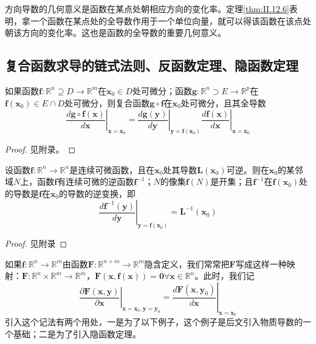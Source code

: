 \documentclass[main.tex]{subfiles}
\begin{document}
方向导数的几何意义是函数在某点处朝相应方向的变化率。定理\ref{thm:II.12.6}表明，拿一个函数在某点处的全导数作用于一个单位向量，就可以得该函数在该点处朝该方向的变化率。这也是函数的全导数的重要几何意义。
\subsection{复合函数求导的链式法则、反函数定理、隐函数定理}
\begin{theorem}[复合函数求导的链式法则]\label{thm:II.12.7}
如果函数$\mathbf{f}:\mathbb{R}^n\supseteq D\rightarrow\mathbb{R}^m$在$\mathbf{x}_0\in D$处可微分；函数$\mathbf{g}:\mathbb{R}^n\supset E\rightarrow\mathbb{R}^p$在$\mathbf{f}\left(\mathbf{x}_0\right)\in E\cap D$处可微分，则复合函数$\mathbf{g}\circ\mathbf{f}$在$\mathbf{x}_0$处可微分，且其全导数
\[
\left.\frac{d\mathbf{g}\circ\mathbf{f}\left(\mathbf{x}\right)}{d\mathbf{x}}\right|_{\mathbf{x}=\mathbf{x}_0}=\left.\frac{d\mathbf{g}\left(\mathbf{y}\right)}{d\mathbf{y}}\right|_{\mathbf{y}=\mathbf{f}\left(\mathbf{x}_0\right)}\left.\frac{d\mathbf{f}\left(\mathbf{x}\right)}{d\mathbf{x}}\right|_{\mathbf{x}=\mathbf{x}_0}
\]
\end{theorem}
\begin{proof}
见附录。
\end{proof}

\begin{theorem}[反函数定理]\label{thm:II.12.8}
设函数$\mathbf{f}:\mathbb{R}^n\rightarrow\mathbb{R}^n$是连续可微函数，且在$\mathbf{x}_0$处其导数$\mathbf{L}\left(\mathbf{x}_0\right)$可逆。则在$\mathbf{x}_0$的某邻域$N$上，函数$\mathbf{f}$有连续可微的逆函数$\mathbf{f}^{-1}$；$N$的像集$\mathbf{f}\left(N\right)$是开集；且$\mathbf{f}^{-1}$在$\mathbf{f}\left(\mathbf{x}_0\right)$处的导数是$\mathbf{f}$在$\mathbf{x}_0$的导数的逆变换，即
\[\left.\frac{d\mathbf{f}^{-1}\left(\mathbf{y}\right)}{d\mathbf{y}}\right|_{\mathbf{y}=\mathbf{f}\left(\mathbf{x}_0\right)}=\mathbf{L}^{-1}\left(\mathbf{x}_0\right)\]
\end{theorem}
\begin{proof}
见附录
\end{proof}

如果$\mathbf{f}:\mathbb{R}^n\rightarrow\mathbb{R}^m$由函数$\mathbf{F}:\mathbb{R}^{n+m}\rightarrow\mathbb{R}^m$隐含定义，我们常常把$\mathbf{F}$写成这样一种映射：$\mathbf{F}:\mathbb{R}^n\times\mathbb{R}^m\rightarrow\mathbb{R}^m$，$\mathbf{F}\left(\mathbf{x},\mathbf{f}\left(\mathbf{x}\right)\right)=\mathbf{0}\forall\mathbf{x}\in\mathbb{R}^n$。此时，我们记
\[\left.\frac{\partial \mathbf{F}\left(\mathbf{x},\mathbf{y}\right)}{\partial \mathbf{x}}\right|_{\mathbf{x}=\mathbf{x}_0,\mathbf{y}=\mathbf{y}_0}=\left.\frac{d\mathbf{F}\left(\mathbf{x},\mathbf{y}_0\right)}{d\mathbf{x}}\right|_{\mathbf{x}=\mathbf{x}_0}\]
引入这个记法有两个用处，一是为了以下例子，这个例子是后文引入物质导数的一个基础；二是为了引入隐函数定理。
\end{document}
